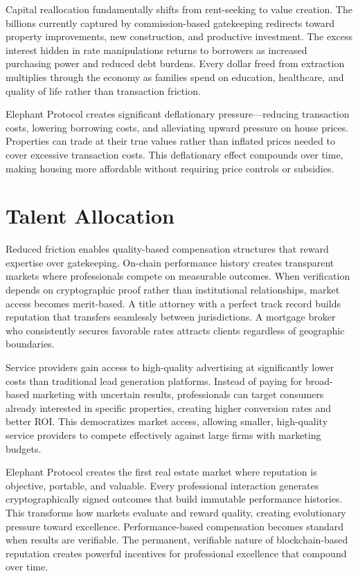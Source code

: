 Capital reallocation fundamentally shifts from rent-seeking to value creation. The billions currently captured by commission-based gatekeeping redirects toward property improvements, new construction, and productive investment. The excess interest hidden in rate manipulations returns to borrowers as increased purchasing power and reduced debt burdens. Every dollar freed from extraction multiplies through the economy as families spend on education, healthcare, and quality of life rather than transaction friction.

Elephant Protocol creates significant deflationary pressure---reducing transaction costs, lowering borrowing costs, and alleviating upward pressure on house prices. Properties can trade at their true values rather than inflated prices needed to cover excessive transaction costs. This deflationary effect compounds over time, making housing more affordable without requiring price controls or subsidies.

\section{Talent Allocation}

Reduced friction enables quality-based compensation structures that reward expertise over gatekeeping. On-chain performance history creates transparent markets where professionals compete on measurable outcomes. When verification depends on cryptographic proof rather than institutional relationships, market access becomes merit-based. A title attorney with a perfect track record builds reputation that transfers seamlessly between jurisdictions. A mortgage broker who consistently secures favorable rates attracts clients regardless of geographic boundaries.

Service providers gain access to high-quality advertising at significantly lower costs than traditional lead generation platforms. Instead of paying for broad-based marketing with uncertain results, professionals can target consumers already interested in specific properties, creating higher conversion rates and better ROI. This democratizes market access, allowing smaller, high-quality service providers to compete effectively against large firms with marketing budgets.

Elephant Protocol creates the first real estate market where reputation is objective, portable, and valuable. Every professional interaction generates cryptographically signed outcomes that build immutable performance histories. This transforms how markets evaluate and reward quality, creating evolutionary pressure toward excellence. Performance-based compensation becomes standard when results are verifiable. The permanent, verifiable nature of blockchain-based reputation creates powerful incentives for professional excellence that compound over time.

